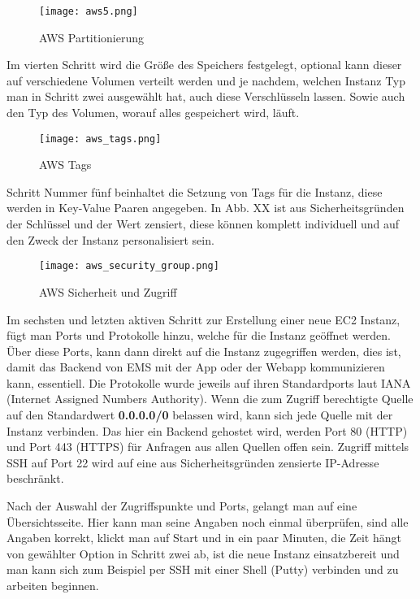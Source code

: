 \begin{center}
\begin{figure}[h]
    \centering
    \texttt{[image: aws5.png]}
    \caption{AWS Partitionierung}
\end{figure}
\end{center}

Im vierten Schritt wird die Größe des Speichers festgelegt, optional kann dieser auf verschiedene Volumen verteilt werden und je nachdem, welchen Instanz Typ man in Schritt zwei ausgewählt hat, auch diese Verschlüsseln lassen. Sowie auch den Typ des Volumen, worauf alles gespeichert wird, läuft.

\begin{center}
\begin{figure}[h]
    \centering
    \texttt{[image: aws\_tags.png]}
    \caption{AWS Tags}
\end{figure}
\end{center}

Schritt Nummer fünf beinhaltet die Setzung von Tags für die Instanz, diese werden in Key-Value Paaren angegeben. In Abb. XX ist aus Sicherheitsgründen der Schlüssel und der Wert zensiert, diese können komplett individuell und auf den Zweck der Instanz personalisiert sein.

\begin{center}
\begin{figure}[h]
    \centering
    \texttt{[image: aws\_security\_group.png]}
    \caption{AWS Sicherheit und Zugriff}
\end{figure}
\end{center}

Im sechsten und letzten aktiven Schritt zur Erstellung einer neue EC2 Instanz, fügt man Ports und Protokolle hinzu, welche für die Instanz geöffnet werden. Über diese Ports, kann dann direkt auf die Instanz zugegriffen werden, dies ist, damit das Backend von EMS mit der App oder der Webapp kommunizieren kann, essentiell. Die Protokolle wurde jeweils auf ihren Standardports laut IANA (Internet Assigned Numbers Authority). Wenn die zum Zugriff berechtigte Quelle auf den Standardwert \textbf{0.0.0.0/0} belassen wird, kann sich jede Quelle mit der Instanz verbinden.
Das hier ein Backend gehostet wird, werden Port 80 (HTTP) und Port 443 (HTTPS) für Anfragen aus allen Quellen offen sein. Zugriff mittels SSH auf Port 22 wird auf eine aus Sicherheitsgründen zensierte IP-Adresse beschränkt.

Nach der Auswahl der Zugriffspunkte und Ports, gelangt man auf eine Übersichtsseite. Hier kann man seine Angaben noch einmal überprüfen, sind alle Angaben korrekt, klickt man auf Start und in ein paar Minuten, die Zeit hängt von gewählter Option in Schritt zwei ab, ist die neue Instanz einsatzbereit und man kann sich zum Beispiel per SSH mit einer Shell (Putty) verbinden und zu arbeiten beginnen. 

